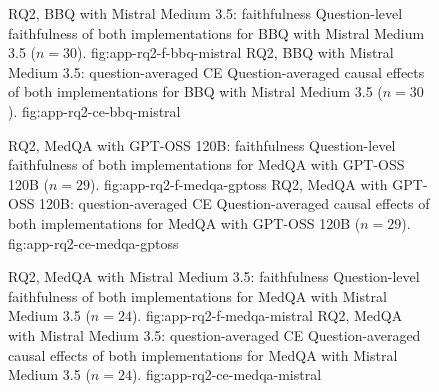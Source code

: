 \begin{figure}[H]
  \centering
    {RQ2, BBQ with Mistral Medium 3.5: faithfulness}%
    {Question-level faithfulness of both implementations for BBQ with Mistral Medium 3.5 ($n=30$).}%
    {fig:app-rq2-f-bbq-mistral}%
  \hfill
    {RQ2, BBQ with Mistral Medium 3.5: question-averaged CE}%
    {Question-averaged causal effects of both implementations for BBQ with Mistral Medium 3.5 ($n=30$).}%
    {fig:app-rq2-ce-bbq-mistral}%
\end{figure}

\begin{figure}[H]
  \centering
    {RQ2, MedQA with GPT-OSS 120B: faithfulness}%
    {Question-level faithfulness of both implementations for MedQA with GPT-OSS 120B ($n=29$).}%
    {fig:app-rq2-f-medqa-gptoss}%
  \hfill
    {RQ2, MedQA with GPT-OSS 120B: question-averaged CE}%
    {Question-averaged causal effects of both implementations for MedQA with GPT-OSS 120B ($n=29$).}%
    {fig:app-rq2-ce-medqa-gptoss}%
\end{figure}

\begin{figure}[H]
  \centering
    {RQ2, MedQA with Mistral Medium 3.5: faithfulness}%
    {Question-level faithfulness of both implementations for MedQA with Mistral Medium 3.5 ($n=24$).}%
    {fig:app-rq2-f-medqa-mistral}%
  \hfill
    {RQ2, MedQA with Mistral Medium 3.5: question-averaged CE}%
    {Question-averaged causal effects of both implementations for MedQA with Mistral Medium 3.5 ($n=24$).}%
    {fig:app-rq2-ce-medqa-mistral}%
\end{figure}

